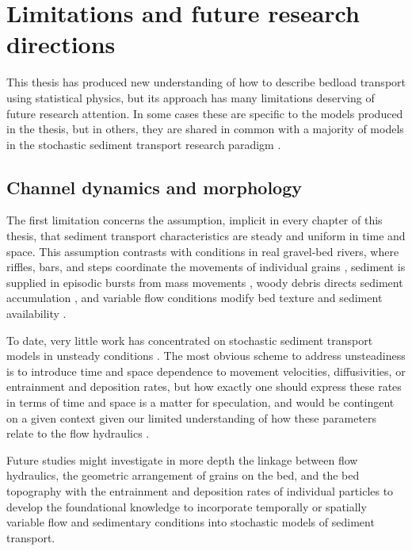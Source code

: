\section{Limitations and future research directions}

This thesis has produced new understanding of how to describe bedload transport using statistical physics, but its approach has many limitations deserving of future research attention.
In some cases these are specific to the models produced in the thesis, but in others, they are shared in common with a majority of models in the stochastic sediment transport research paradigm \citep{Ancey2020,Furbish2021a}.

\subsection{Channel dynamics and morphology}

The first limitation concerns the assumption, implicit in every chapter of this thesis, that sediment transport characteristics are steady and uniform in time and space.
This assumption contrasts with conditions in real gravel-bed rivers, where riffles, bars, and steps coordinate the movements of individual grains \citep{Ashmore1998,McDowell2020}, sediment is supplied in episodic bursts from mass movements \citep{Benda1990, Muller2018}, woody debris directs sediment accumulation \citep{Eaton2012,Reid2019}, and variable flow conditions modify bed texture and sediment availability \citep{Mao2012,Phillips2018}.

To date, very little work has concentrated on stochastic sediment transport models in unsteady conditions \citep[e.g.][]{Bohorquez2016}.
The most obvious scheme to address unsteadiness is to introduce time and space dependence to movement velocities, diffusivities, or entrainment and deposition rates, but how exactly one should express these rates in terms of time and space is a matter for speculation, and would be contingent on a given context given our limited understanding of how these parameters relate to the flow hydraulics \citep[e.g.][]{Heyman2016}.

Future studies might investigate in more depth the linkage between flow hydraulics, the geometric arrangement of grains on the bed, and the bed topography with the entrainment and deposition rates of individual particles to develop the foundational knowledge to incorporate temporally or spatially variable flow and sedimentary conditions into stochastic models of sediment transport.

